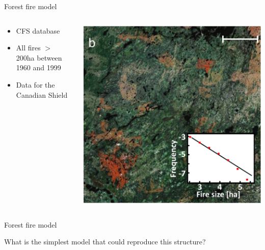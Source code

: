 \documentclass{eecslides}
\begin{document}

	\begin{frame}{Forest fire model}
		\begin{columns}
			\begin{column}{0.4\textwidth}
				\begin{itemize}
					\item CFS database
					\item All fires $>$ 200ha between 1960 and 1999
					\item Data for the Canadian Shield
				\end{itemize}
			\end{column}
			\begin{column}{0.6\textwidth}
				\begin{center}
					\includegraphics[height=0.6\textheight]{fire}
				\end{center}
			\end{column}
		\end{columns}	 
	\end{frame}


	\begin{frame}{Forest fire model}
		
		What is the simplest model that could reproduce this structure?

	\end{frame}
\end{document}
